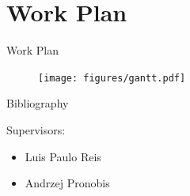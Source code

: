 \documentclass[compress]{beamer}
\begin{document}
\section{Work Plan}
\begin{frame}{Work Plan}
\begin{figure}
\texttt{[image: figures/gantt.pdf]}
\end{figure}

\end{frame}


\appendix

\begin{frame}[allowframebreaks]{Bibliography}


\end{frame}


\begin{frame}
    \titlepage
    Supervisors:
    \begin{itemize}
    \item Luis Paulo Reis
    \item Andrzej Pronobis
    \end{itemize}
\end{frame}
\end{document}
